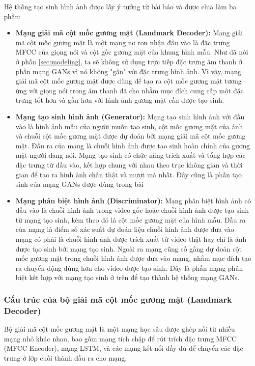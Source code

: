 Hệ thống tạo sinh hình ảnh được lấy ý tưởng từ bài báo \cite{chen2019} và được chia làm ba phần:
\begin{itemize}
    \item \textbf{Mạng giải mã cột mốc gương mặt (Landmark Decoder):} Mạng giải mã cột mốc gương mặt là một mạng nơ ron nhận đầu vào là đặc trưng MFCC của giọng nói và cột gốc gương mặt của khung hình mẫu. Như đã nói ở phần \ref{sec:modeling}, ta sẽ không sử dụng trực tiếp đặc trưng âm thanh ở phần mạng GANs vì nó không "gần" với đặc trưng hình ảnh. Vì vậy, mạng giải mã cột mốc gương mặt được dùng để tạo ra cột mốc gương mặt tương ứng với giọng nói trong âm thanh đã cho nhằm mục đích cung cấp một đặc trưng tốt hơn và gần hơn với hình ảnh gương mặt cần được tạo sinh.
    \item \textbf{Mạng tạo sinh hình ảnh (Generator):} Mạng tạo sinh hình ảnh với đầu vào là hình ảnh mẫu của người muốn tạo sinh, cột mốc gương mặt của ảnh và chuỗi cột mốc gương mặt được dự đoán bởi mạng giải mã cột mốc gương mặt. Đầu ra của mạng là chuỗi hình ảnh được tạo sinh hoàn chỉnh của gương mặt người đang nói. Mạng tạo sinh có chức năng trích xuất và tổng hợp các đặc trưng từ đầu vào, kết hợp chung với nhau theo trục không gian và thời gian để tạo ra hình ảnh chân thật và mượt mà nhất. Đây cũng là phần tạo sinh của mạng GANs được dùng trong bài
    \item \textbf{Mạng phân biệt hình ảnh (Discriminator):} Mạng phân biệt hình ảnh có đầu vào là chuỗi hình ảnh trong video gốc hoặc chuỗi hình ảnh được tạo sinh từ mạng tạo sinh, kèm theo đó là cột mốc gương mặt của hình mẫu. Đầu ra của mạng là điểm số xác suất dự đoán liệu chuỗi hình ảnh được đưa vào mạng có phải là chuỗi hình ảnh được trích xuất từ video thật hay chỉ là ảnh được tạo sinh bởi mạng tạo sinh. Ngoài ra mạng cũng cố gắng dự đoán cột mốc gương mặt trong chuỗi hình ảnh được đưa vào mạng, nhằm mục đích tạo ra chuyển động đúng hơn cho video được tạo sinh. Đây là phần mạng phân biệt kết hợp với mạng tạo sinh ở trên để tạo thành hệ thống mạng GANs.
\end{itemize}

\subsubsection{Cấu trúc của bộ giải mã cột mốc gương mặt (Landmark Decoder)}

Bộ giải mã cột mốc gương mặt là một mạng học sâu được ghép nối từ nhiều mạng nhỏ khác nhau, bao gồm mạng tích chập để rút trích đặc trưng MFCC (MFCC Encoder), mạng LSTM, và các mạng kết nối đầy đủ để chuyển các đặc trưng ở lớp cuối thành đầu ra cho mạng.

